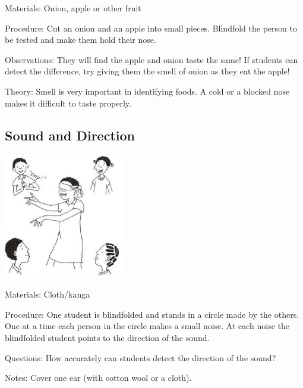 \begin{multicols}{2}
\begin{description*}
\item[Materials:]{Onion, apple or other fruit}
\item[Procedure:]{Cut an onion and an apple into small pieces. Blindfold the person to be
tested and make them hold their nose.}
\item[Observations:]{They will find the apple and
onion taste the same! If students can detect the difference, try giving
them the smell of onion as they eat the apple!}
\item[Theory:]{Smell is very important
in identifying foods. A cold or a blocked nose makes it difficult to taste
properly.}
\end{description*}

\columnbreak

\subsection{Sound and Direction}

\begin{center}
\includegraphics[width=0.4\textwidth]{./img/vso/sound-direction.jpg}
\end{center}

\begin{description*}
\item[Materials:]{Cloth/kanga}
\item[Procedure:]{One student is blindfolded and
stands in a circle made by the
others. One at a time each person
in the circle makes a small noise.
At each noise the blindfolded
student points to the direction of
the sound.}
\item[Questions:]{How accurately can students
detect the direction of the sound?}
\item[Notes:]{Cover one ear (with cotton wool
or a cloth).}
\end{description*}


\end{multicols}
